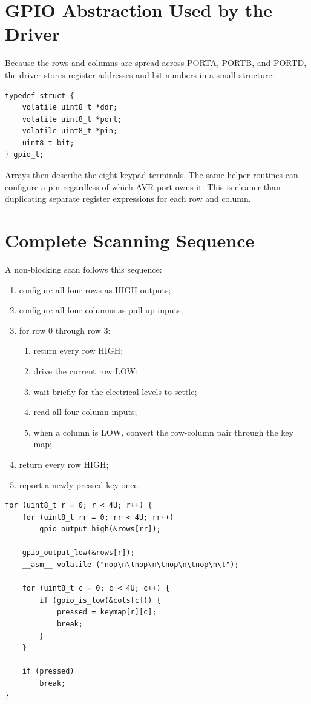 \documentclass[11pt,a4paper]{article}
\begin{document}
\section{GPIO Abstraction Used by the Driver}
Because the rows and columns are spread across PORTA, PORTB, and PORTD, the driver stores register addresses and bit numbers in a small structure:
\begin{lstlisting}[style=cstyle]
typedef struct {
    volatile uint8_t *ddr;
    volatile uint8_t *port;
    volatile uint8_t *pin;
    uint8_t bit;
} gpio_t;
\end{lstlisting}
Arrays then describe the eight keypad terminals. The same helper routines can configure a pin regardless of which AVR port owns it. This is cleaner than duplicating separate register expressions for each row and column.

\section{Complete Scanning Sequence}
A non-blocking scan follows this sequence:
\begin{enumerate}
  \item configure all four rows as HIGH outputs;
  \item configure all four columns as pull-up inputs;
  \item for row 0 through row 3:
  \begin{enumerate}[label=\alph*.]
    \item return every row HIGH;
    \item drive the current row LOW;
    \item wait briefly for the electrical levels to settle;
    \item read all four column inputs;
    \item when a column is LOW, convert the row-column pair through the key map;
  \end{enumerate}
  \item return every row HIGH;
  \item report a newly pressed key once.
\end{enumerate}

\begin{lstlisting}[style=cstyle,caption={Core matrix scan.}]
for (uint8_t r = 0; r < 4U; r++) {
    for (uint8_t rr = 0; rr < 4U; rr++)
        gpio_output_high(&rows[rr]);

    gpio_output_low(&rows[r]);
    __asm__ volatile ("nop\n\tnop\n\tnop\n\tnop\n\t");

    for (uint8_t c = 0; c < 4U; c++) {
        if (gpio_is_low(&cols[c])) {
            pressed = keymap[r][c];
            break;
        }
    }

    if (pressed)
        break;
}
\end{lstlisting}
\end{document}

